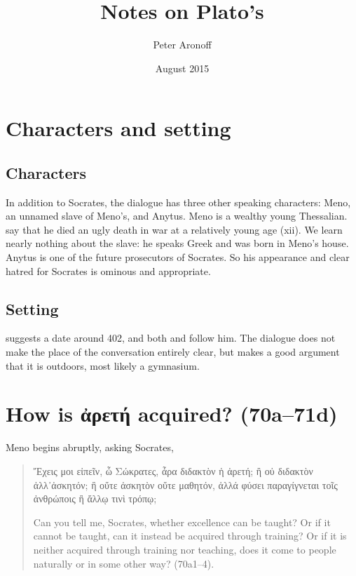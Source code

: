 \documentclass[11pt]{article}
\begin{document}
\begin{titlepage}
\title{Notes on Plato's }
\author{Peter Aronoff}
\date{August 2015}
\maketitle
\thispagestyle{empty}
\end{titlepage}

\section{Characters and setting}

\subsection{Characters}

In addition to Socrates, the dialogue has three other speaking characters: Meno, an unnamed slave of Meno's, and Anytus. Meno is a wealthy young Thessalian. \citet{sedleylong2010} say that he died an ugly death in war at a relatively young age (xii). We learn nearly nothing about the slave: he speaks Greek and was born in Meno's house. Anytus is one of the future prosecutors of Socrates. So his appearance and clear hatred for Socrates is ominous and appropriate.


\subsection{Setting}

\citet[76]{morrison1942} suggests a date around 402, and both \citet[120]{bluck1961} and \citet[xii]{sedleylong2010} follow him. The dialogue does not make the place of the conversation entirely clear, but \citet[120]{bluck1961} makes a good argument that it is outdoors, most likely a gymnasium.



\section{How is {\g ἀρετή} acquired? (70a--71d)}

Meno begins abruptly, asking Socrates,

\begin{quote}
   {\g Ἔχεις μοι εἰπεῖν, ὦ Σώκρατες, ἆρα διδακτὸν ἡ ἀρετή; ἢ οὐ διδακτὸν ἀλλ᾽ἀσκητόν; ἢ οὔτε ἀσκητὸν οὔτε μαθητόν, ἀλλά φύσει παραγίγνεται τοῖς ἀνθρώποις ἢ ἄλλῳ τινὶ τρόπῳ;}
    
   Can you tell me, Socrates, whether excellence can be taught? Or if it cannot be taught, can it instead be acquired through training? Or if it is neither acquired through training nor teaching, does it come to people naturally or in some other way? (70a1--4).
\end{quote}
\end{document}
